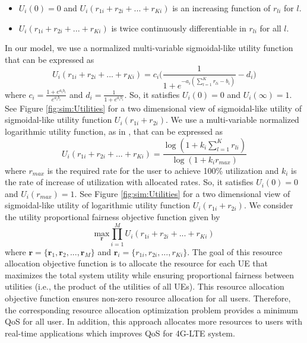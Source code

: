 \documentclass[conference]{IEEEtran}
\begin{document}
\begin{itemize}
\item $U_i(0) = 0$ and $U_i(r_{1i}+r_{2i}+ ...+r_{Ki})$ is an increasing function of $r_{li}$ for $l$.
\item $U_i(r_{1i}+r_{2i}+ ...+r_{Ki})$ is twice continuously differentiable in $r_{li}$ for all $l$.
\end{itemize}
In our model, we use a normalized multi-variable sigmoidal-like utility function that can be expressed as 
\begin{equation}\label{eqn:sigmoid}
U_i(r_{1i}+r_{2i}+ ...+r_{Ki}) = c_i\Big(\frac{1}{1+e^{-a_i(\sum_{l=1}^{K}r_{li}-b_i)}}-d_i\Big)
\end{equation}
where $c_i = \frac{1+e^{a_ib_i}}{e^{a_ib_i}}$ and $d_i = \frac{1}{1+e^{a_ib_i}}$. So, it satisfies $U_i(0)=0$ and $U_i(\infty)=1$. See Figure \ref{fig:sim:Utilities} for a two dimensional view of sigmoidal-like utility of sigmoidal-like utility function $U_i(r_{1i} +r_{2i})$. We use a multi-variable normalized logarithmic utility function, as in \cite{UtilityFairness}, that can be expressed as 
\begin{equation}\label{eqn:log}
U_i(r_{1i}+r_{2i}+ ...+r_{Ki}) = \frac{\log(1+k_i\sum_{l=1}^{K}r_{li})}{\log(1+k_ir_{max})}
\end{equation}
where $r_{max}$ is the required rate for the user to achieve 100\% utilization and $k_i$ is the rate of increase of utilization with allocated rates. So, it satisfies $U_i(0)=0$ and $U_i(r_{max})=1$. See Figure \ref{fig:sim:Utilities} for a two dimensional view of sigmoidal-like utility of logarithmic utility function $U_i(r_{1i} +r_{2i})$. We consider the utility proportional fairness objective function given by 
\begin{equation}\label{eqn:utility_fairness}
\underset{\textbf{r}}{\text{max}} \prod_{i=1}^{M}U_i(r_{1i} + r_{2i} + ... + r_{Ki}) 
\end{equation}
where $\textbf{r} =\{\textbf{r}_1, \textbf{r}_2,..., \textbf{r}_M\}$ and $\textbf{r}_i =\{r_{1i}, r_{2i},..., r_{Ki}\}$. The goal of this resource allocation objective function is to allocate the resource for each UE that maximizes the total system utility while ensuring proportional fairness between utilities (i.e., the product of the utilities of all UEs). This resource allocation objective function ensures non-zero resource allocation for all users. Therefore, the corresponding resource allocation optimization problem provides a minimum QoS for all user. In addition, this approach allocates more resources to users with real-time applications which improves QoS for 4G-LTE system. 
\end{document}
